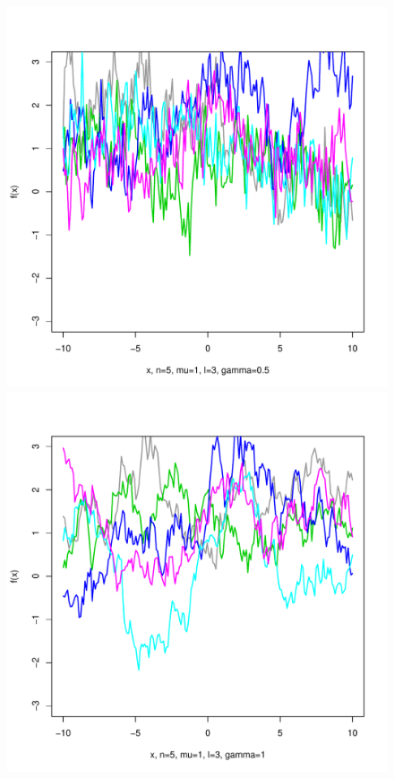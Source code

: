 \documentclass[12pt,letterpaper]{article}
\begin{document}
\begin{figure}
\begin{center}
\includegraphics[scale=0.2]{hw321/n5-m1-l3-g1.pdf}
\includegraphics[scale=0.2]{hw321/n5-m1-l3-g2.pdf}

\end{center}
\end{figure}
\end{document}
